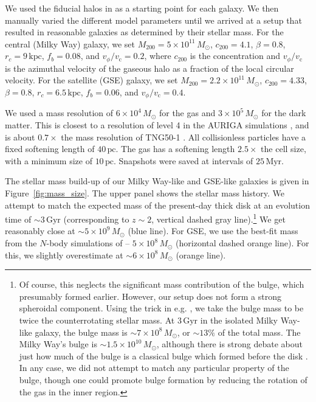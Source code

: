\documentclass[linenumbers, twocolumn]{aastex631}
\newcommand{\Msun}{\ensuremath{M_{\odot}}}
\newcommand{\Gyr}{\ensuremath{\textrm{Gyr}}}
\newcommand{\Myr}{\ensuremath{\textrm{Myr}}}
\newcommand{\kpc}{\ensuremath{\textrm{kpc}}}
\newcommand{\pc}{\ensuremath{\textrm{pc}}}
\begin{document}
We used the fiducial halos in \citet{2021ApJ...923...92N} as a starting point for each galaxy. We then manually varied the different model parameters until we arrived at a setup that resulted in reasonable galaxies as determined by their stellar mass. For the central (Milky Way) galaxy, we set $M_{200}=5\times10^{11}\,\Msun$, $c_{200}=4.1$, $\beta=0.8$, $r_c=9\,\kpc$, $f_b=0.08$, and $v_{\phi}/v_{\textrm{c}}=0.2$, where $c_{200}$ is the concentration and $v_{\phi}/v_{\textrm{c}}$ is the azimuthal velocity of the gaseous halo as a fraction of the local circular velocity. For the satellite (GSE) galaxy, we set $M_{200}=2.2\times10^{11}\,\Msun$, $c_{200}=4.33$, $\beta=0.8$, $r_c=6.5\,\kpc$, $f_b=0.06$, and $v_{\phi}/v_{\textrm{c}}=0.4$.

We used a mass resolution of $6\times10^4\,\Msun$ for the gas and $3\times10^5\,\Msun$ for the dark matter. This is closest to a resolution of level 4 in the AURIGA simulations \citep{2017MNRAS.467..179G}, and is about $0.7\times$ the mass resolution of TNG50-1 \citep{2019MNRAS.490.3234N,2019MNRAS.490.3196P}. All collisionless particles have a fixed softening length of $40\,\pc$. The gas has a softening length $2.5\times$ the cell size, with a minimum size of $10\,\pc$. Snapshots were saved at intervals of $25\,\Myr$.

The stellar mass build-up of our Milky Way-like and GSE-like galaxies is given in Figure~\ref{fig:mass_size}. The upper panel shows the stellar mass history. We attempt to match the expected mass of the present-day thick disk \citep[$\sim6\times10^9\,\Msun$, horizontal blue dashed line][]{2016ARA&A..54..529B} at an evolution time of $\sim3\,\Gyr$ (corresponding to $z\sim2$, vertical dashed gray line).\footnote{Of course, this neglects the significant mass contribution of the bulge, which presumably formed earlier. However, our setup does not form a strong spheroidal component. Using the trick in e.g. \citet{2022MNRAS.515.1524Z}, we take the bulge mass to be twice the counterrotating stellar mass. At $3\,\Gyr$ in the isolated Milky Way-like galaxy, the bulge mass is $\sim7\times10^{8}\,\Msun$, or $\sim13\%$ of the total mass. The Milky Way's bulge is  $\sim1.5\times10^{10}\,\Msun$, although there is strong debate about just how much of the bulge is a classical bulge which formed before the disk \citep{2016ARA&A..54..529B}. In any case, we did not attempt to match any particular property of the bulge, though one could promote bulge formation by reducing the rotation of the gas in the inner region.} We get reasonably close at $\sim5\times10^9\,\Msun$ (blue line). For GSE, we use the best-fit mass from the $N$-body simulations of \citet{2021ApJ...923...92N} -- $5\times10^8\,\Msun$ (horizontal dashed orange line). For this, we slightly overestimate at $\sim6\times10^8\,\Msun$ (orange line).
\end{document}

